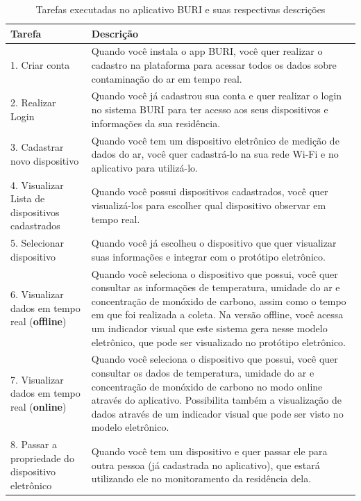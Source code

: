\documentclass[alpha-refs,brazilian]{RBCA_v3.0}
\begin{document}
\begin{table}[ht]
    \centering
    \caption{Tarefas executadas no aplicativo BURI e suas respectivas descrições}
    \label{tab:buri-tarefas}
    \begin{tabular}{lp{10.3cm}}
        \toprule
        \textbf{Tarefa} & \textbf{Descrição} \\
        \midrule
        1. Criar conta & Quando você  instala o app BURI, você quer realizar o cadastro na plataforma para acessar todos os dados sobre contaminação do ar em tempo real. \\
        2. Realizar Login & Quando você já cadastrou sua conta e quer realizar o login no sistema BURI para ter acesso aos seus dispositivos e informações da sua residência. \\
        3. Cadastrar novo dispositivo & Quando você tem um dispositivo eletrônico de medição de dados do ar, você quer cadastrá-lo na sua rede Wi-Fi e no aplicativo para utilizá-lo. \\
        4. Visualizar Lista de dispositivos cadastrados & Quando você possui dispositivos cadastrados, você quer visualizá-los para escolher qual dispositivo observar em tempo real. \\
        5. Selecionar dispositivo & Quando você já escolheu o dispositivo que quer visualizar suas informações e integrar com o protótipo eletrônico. \\
        6. Visualizar dados em tempo real (\textbf{offline}) & Quando você seleciona o dispositivo que possui, você quer consultar as informações de temperatura, umidade do ar e concentração de monóxido de carbono, assim como o tempo em que foi realizada a coleta. Na versão offline, você acessa um indicador visual que este sistema gera nesse modelo eletrônico, que pode ser visualizado no protótipo eletrônico. \\
        7. Visualizar dados em tempo real (\textbf{online}) & Quando você seleciona o dispositivo que possui, você quer consultar os dados de temperatura, umidade do ar e concentração de monóxido de carbono no modo online através do aplicativo. Possibilita também a visualização de dados através de um indicador visual que pode ser visto no modelo eletrônico. \\
        8. Passar a propriedade do dispositivo eletrônico & Quando você tem um dispositivo e quer passar ele para outra pessoa (já cadastrada no aplicativo), que estará utilizando ele no monitoramento da residência dela. \\
        \bottomrule
    \end{tabular}
\end{table}
\end{document}
